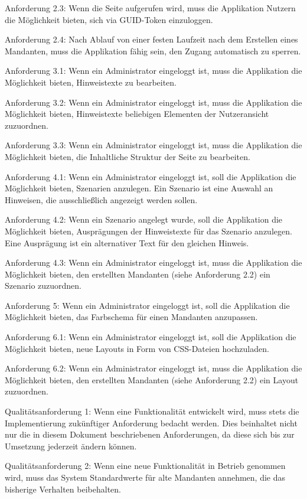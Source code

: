 Anforderung 2.3: Wenn die Seite aufgerufen wird, muss die Applikation Nutzern die Möglichkeit bieten, sich via GUID-Token einzuloggen.


Anforderung 2.4: Nach Ablauf von einer festen Laufzeit nach dem Erstellen eines Mandanten, muss die Applikation fähig sein, den Zugang automatisch zu sperren.


Anforderung 3.1: Wenn ein Administrator eingeloggt ist, muss die Applikation die Möglichkeit bieten, Hinweistexte zu bearbeiten.


Anforderung 3.2: Wenn ein Administrator eingeloggt ist, muss die Applikation die Möglichkeit bieten, Hinweistexte beliebigen Elementen der Nutzeransicht zuzuordnen.


Anforderung 3.3: Wenn ein Administrator eingeloggt ist, muss die Applikation die Möglichkeit bieten, die Inhaltliche Struktur der Seite zu bearbeiten. 


Anforderung 4.1: Wenn ein Administrator eingeloggt ist, soll die Applikation die Möglichkeit bieten, Szenarien anzulegen.
Ein Szenario ist eine Auswahl an Hinweisen, die ausschließlich angezeigt werden sollen. 


Anforderung 4.2: Wenn ein Szenario angelegt wurde, soll die Applikation die Möglichkeit bieten, Ausprägungen der Hinweistexte für das Szenario anzulegen. 
Eine Ausprägung ist ein alternativer Text für den gleichen Hinweis.


Anforderung 4.3: Wenn ein Administrator eingeloggt ist, muss die Applikation die Möglichkeit bieten, den erstellten Mandanten (siehe Anforderung 2.2) ein Szenario zuzuordnen.


Anforderung 5: Wenn ein Administrator eingeloggt ist, soll die Applikation die Möglichkeit bieten, das Farbschema für einen Mandanten anzupassen.


Anforderung 6.1: Wenn ein Administrator eingeloggt ist, soll die Applikation die Möglichkeit bieten, neue Layouts in Form von CSS-Dateien hochzuladen.


Anforderung 6.2: Wenn ein Administrator eingeloggt ist, muss die Applikation die Möglichkeit bieten, den erstellten Mandanten (siehe Anforderung 2.2) ein Layout zuzuordnen.


Qualitätsanforderung 1: Wenn eine Funktionalität entwickelt wird, muss stets die Implementierung zukünftiger Anforderung bedacht werden.
Dies beinhaltet nicht nur die in diesem Dokument beschriebenen Anforderungen, da diese sich bis zur Umsetzung jederzeit ändern können.


Qualitätsanforderung 2: Wenn eine neue Funktionalität in Betrieb genommen wird, muss das System Standardwerte für alte Mandanten annehmen, die das bisherige Verhalten beibehalten.


